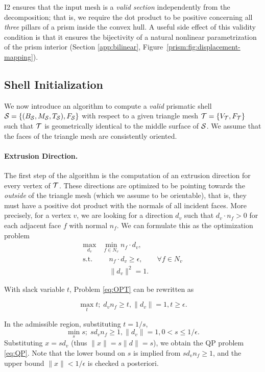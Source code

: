 I2 ensures that the input mesh is a \emph{valid section} independently from the decomposition; that is, we require the dot product to be positive concerning all \emph{three} pillars of a prism inside the convex hull. 
A useful side effect of this validity condition is that it ensures the bijectivity of a natural nonlinear parametrization of the prism interior (Section \ref{app:bilinear}, Figure~\ref{prism:fig:displacement-mapping}).

\subsection{Shell Initialization}
\label{prism:sec:initialization}

We now introduce an algorithm to compute a \emph{valid} prismatic shell $\S = \{(B_\S,M_\S,T_\S),F_\S\}$ with respect to a given triangle mesh $\T = \{V_\T,F_\T\}$ such that $\T$ is geometrically identical to the middle surface of $\S$.  We assume that the faces of the triangle mesh are consistently oriented.

\paragraph{Extrusion Direction.} The first step of the algorithm is the computation of an extrusion direction for every vertex of $\T$. These directions are optimized to be pointing towards the \emph{outside} of the triangle mesh (which we assume to be orientable), that is,
they must have a positive dot product with the normals of all incident faces. More precisely, for a vertex $v$, we are looking for a direction $d_v$ such that $d_v \cdot n_f > 0$ for each adjacent face $f$ with normal $n_f$. We can formulate this as the optimization problem
\begin{equation}
\label{eq:OPT}
\begin{split}
    \max_{d_v}& \min_{f \in N_v} n_f \cdot d_v,\\
    \text{s.t. }&\quad n_f \cdot d_v \geq {\epsilon}, \qquad \forall f \in N_v\\
               &\quad  \|d_v\|^2 = 1.
\end{split}
\end{equation}

With slack variable $t$, Problem \ref{eq:OPT} can be rewritten as

$$\max_t t;\; d_v n_f \geq t, \|d_v\| = 1, t \geq {\epsilon}.$$

In the admissible region, substituting 
$t = 1/s$, 
$$\min_s s;\; s d_v n_f \geq 1, \|d_v\| = 1, {0< s \leq 1/\epsilon}.$$
Substituting $x=s d_v$ (thus $\|x\| = s\|d\| = s$), we obtain the QP problem \ref{eq:QP}. Note that the lower bound on $s$ is implied from $s d_v n_f \geq 1$, and the upper bound $\|x\| < 1/\epsilon$ is checked a posteriori.

